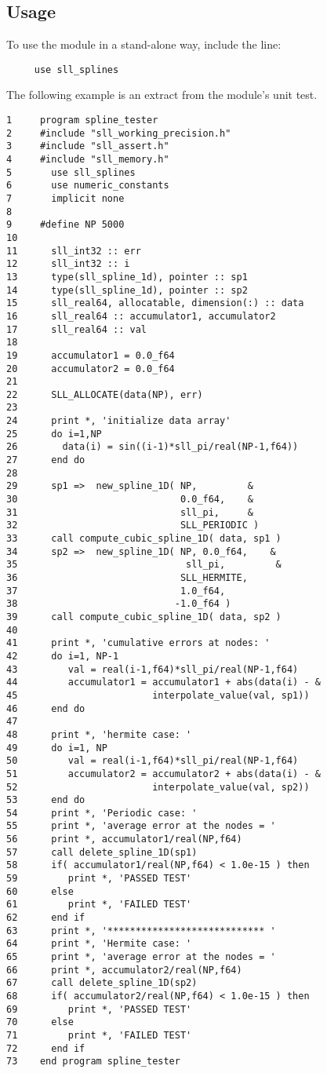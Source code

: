\documentclass[]{report}   %
\begin{document}
\subsection{Usage}
To use the module in a stand-alone way, include the line:\
\begin{verbatim}
     use sll_splines
\end{verbatim}
The following example is an extract from the module's unit test.
\begin{verbatim}
1     program spline_tester
2     #include "sll_working_precision.h"
3     #include "sll_assert.h"
4     #include "sll_memory.h"
5       use sll_splines
6       use numeric_constants
7       implicit none
8
9     #define NP 5000
10
11      sll_int32 :: err
12      sll_int32 :: i
13      type(sll_spline_1d), pointer :: sp1
14      type(sll_spline_1d), pointer :: sp2
15      sll_real64, allocatable, dimension(:) :: data
16      sll_real64 :: accumulator1, accumulator2
17      sll_real64 :: val
18
19      accumulator1 = 0.0_f64
20      accumulator2 = 0.0_f64
21    
22      SLL_ALLOCATE(data(NP), err)
23 
24      print *, 'initialize data array'
25      do i=1,NP
26        data(i) = sin((i-1)*sll_pi/real(NP-1,f64))
27      end do
28
29      sp1 =>  new_spline_1D( NP,         &
30                             0.0_f64,    &
31                             sll_pi,     &
32                             SLL_PERIODIC )
33      call compute_cubic_spline_1D( data, sp1 )
34      sp2 =>  new_spline_1D( NP, 0.0_f64,    &
35	                            sll_pi,         &	
36                             SLL_HERMITE, 
37                             1.0_f64, 
38                            -1.0_f64 )
39      call compute_cubic_spline_1D( data, sp2 )
40  
41      print *, 'cumulative errors at nodes: '
42      do i=1, NP-1
43         val = real(i-1,f64)*sll_pi/real(NP-1,f64)
44         accumulator1 = accumulator1 + abs(data(i) - &
45                        interpolate_value(val, sp1))
46      end do
47
48      print *, 'hermite case: '
49      do i=1, NP
50         val = real(i-1,f64)*sll_pi/real(NP-1,f64)
51         accumulator2 = accumulator2 + abs(data(i) - &
52                        interpolate_value(val, sp2))
53      end do
54      print *, 'Periodic case: '
55      print *, 'average error at the nodes = '
56      print *, accumulator1/real(NP,f64)
57      call delete_spline_1D(sp1)
58      if( accumulator1/real(NP,f64) < 1.0e-15 ) then 
59         print *, 'PASSED TEST'
60      else
61         print *, 'FAILED TEST'
62      end if
63      print *, '**************************** '
64      print *, 'Hermite case: '
65      print *, 'average error at the nodes = '
66      print *, accumulator2/real(NP,f64)
67      call delete_spline_1D(sp2)
68      if( accumulator2/real(NP,f64) < 1.0e-15 ) then 
69         print *, 'PASSED TEST'
70      else
71         print *, 'FAILED TEST'
72      end if
73    end program spline_tester
\end{verbatim}
\end{document}
